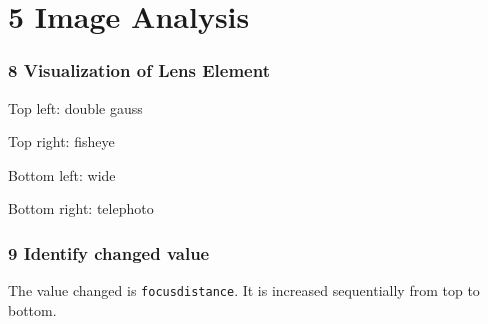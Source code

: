 \documentclass[10pt,letter]{scrartcl}
\theoremstyle{definition} %
\begin{document}
\section*{5 Image Analysis}
\subsubsection*{8 Visualization of Lens Element}%
\begin{compactitem}
\item Top left: double gauss
\item Top right: fisheye
\item Bottom left: wide 
\item Bottom right: telephoto
\end{compactitem}

\subsubsection*{9 Identify changed value}%
The value changed is \texttt{focusdistance}. It is increased sequentially from top to bottom. 


\end{document}
